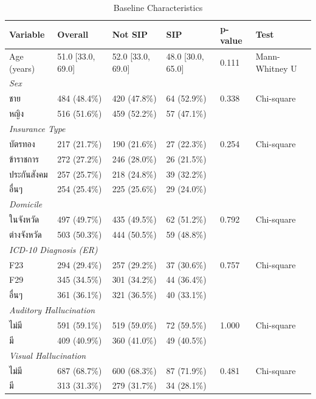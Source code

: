 \begin{table}[htbp]
\centering
\caption{Baseline Characteristics}
\label{tab:tableone}
\begin{tabular}{llllll}
\toprule
\textbf{Variable} & \textbf{Overall} & \textbf{Not SIP} & \textbf{SIP} & \textbf{p-value} & \textbf{Test} \\
\midrule
Age (years) & 51.0 [33.0, 69.0] & 52.0 [33.0, 69.0] & 48.0 [30.0, 65.0] & 0.111 & Mann-Whitney U \\
\multicolumn{6}{l}{\textit{Sex}} \\
\quad ชาย & 484 (48.4\%) & 420 (47.8\%) & 64 (52.9\%) & 0.338 & Chi-square \\
\quad หญิง & 516 (51.6\%) & 459 (52.2\%) & 57 (47.1\%) &  &  \\
\multicolumn{6}{l}{\textit{Insurance Type}} \\
\quad บัตรทอง & 217 (21.7\%) & 190 (21.6\%) & 27 (22.3\%) & 0.254 & Chi-square \\
\quad ข้าราชการ & 272 (27.2\%) & 246 (28.0\%) & 26 (21.5\%) &  &  \\
\quad ประกันสังคม & 257 (25.7\%) & 218 (24.8\%) & 39 (32.2\%) &  &  \\
\quad อื่นๆ & 254 (25.4\%) & 225 (25.6\%) & 29 (24.0\%) &  &  \\
\multicolumn{6}{l}{\textit{Domicile}} \\
\quad ในจังหวัด & 497 (49.7\%) & 435 (49.5\%) & 62 (51.2\%) & 0.792 & Chi-square \\
\quad ต่างจังหวัด & 503 (50.3\%) & 444 (50.5\%) & 59 (48.8\%) &  &  \\
\multicolumn{6}{l}{\textit{ICD-10 Diagnosis (ER)}} \\
\quad F23 & 294 (29.4\%) & 257 (29.2\%) & 37 (30.6\%) & 0.757 & Chi-square \\
\quad F29 & 345 (34.5\%) & 301 (34.2\%) & 44 (36.4\%) &  &  \\
\quad อื่นๆ & 361 (36.1\%) & 321 (36.5\%) & 40 (33.1\%) &  &  \\
\multicolumn{6}{l}{\textit{Auditory Hallucination}} \\
\quad ไม่มี & 591 (59.1\%) & 519 (59.0\%) & 72 (59.5\%) & 1.000 & Chi-square \\
\quad มี & 409 (40.9\%) & 360 (41.0\%) & 49 (40.5\%) &  &  \\
\multicolumn{6}{l}{\textit{Visual Hallucination}} \\
\quad ไม่มี & 687 (68.7\%) & 600 (68.3\%) & 87 (71.9\%) & 0.481 & Chi-square \\
\quad มี & 313 (31.3\%) & 279 (31.7\%) & 34 (28.1\%) &  &  \\

\end{tabular}
\end{table}
